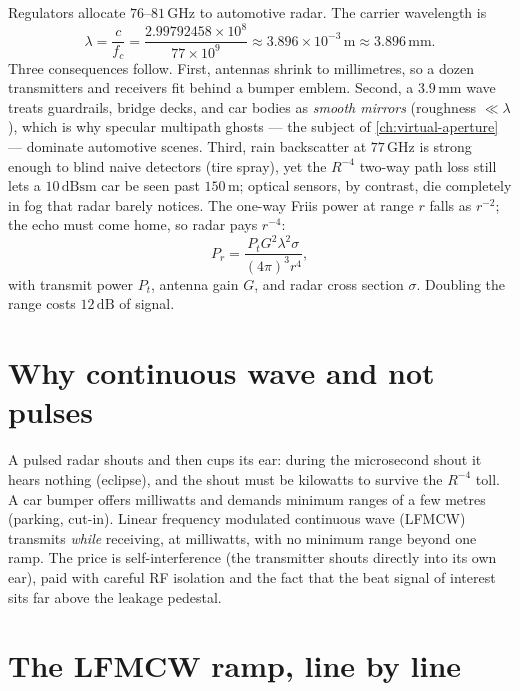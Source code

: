 \documentclass[11pt,oneside]{book}
\begin{document}
Regulators allocate $76$--$81\,\mathrm{GHz}$ to automotive radar. The
carrier wavelength is
\begin{equation}
\lambda = \frac{c}{f_c} = \frac{2.99792458\times10^{8}}{77\times10^{9}}
          \approx 3.896\times10^{-3}\,\mathrm{m} \approx 3.896\,\mathrm{mm}.
\label{eq:lambda}
\end{equation}
Three consequences follow. First, antennas shrink to millimetres, so a
dozen transmitters and receivers fit behind a bumper emblem. Second, a
$3.9\,\mathrm{mm}$ wave treats guardrails, bridge decks, and car bodies as
\emph{smooth mirrors} (roughness $\ll\lambda$), which is why specular
multipath ghosts --- the subject of \cref{ch:virtual-aperture} --- dominate
automotive scenes. Third, rain backscatter at $77\,\mathrm{GHz}$ is strong
enough to blind naive detectors (tire spray), yet the $R^{-4}$ two-way path
loss still lets a $10\,\mathrm{dBsm}$ car be seen past $150\,\mathrm{m}$;
optical sensors, by contrast, die completely in fog that radar barely
notices. The one-way Friis power at range $r$ falls as $r^{-2}$; the echo
must come home, so radar pays $r^{-4}$:
\begin{equation}
P_r = \frac{P_t G^2 \lambda^2 \sigma}{(4\pi)^3 r^4},
\label{eq:radar-equation}
\end{equation}
with transmit power $P_t$, antenna gain $G$, and radar cross section
$\sigma$. Doubling the range costs $12\,\mathrm{dB}$ of signal.

\section{Why continuous wave and not pulses}
\label{sec:why-cw}

A pulsed radar shouts and then cups its ear: during the microsecond shout it
hears nothing (eclipse), and the shout must be kilowatts to survive the
$R^{-4}$ toll. A car bumper offers milliwatts and demands minimum ranges of
a few metres (parking, cut-in). Linear frequency modulated continuous wave
(LFMCW) transmits \emph{while} receiving, at milliwatts, with no minimum
range beyond one ramp. The price is self-interference (the transmitter
shouts directly into its own ear), paid with careful RF isolation and the
fact that the beat signal of interest sits far above the leakage pedestal.

\section{The LFMCW ramp, line by line}
\label{sec:ramp}
\end{document}
